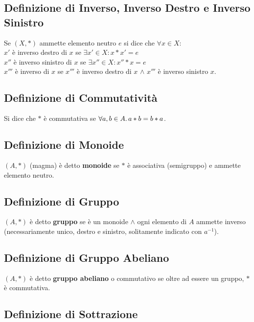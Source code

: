 \documentclass[a4paper, twoside, italian, 11pt]{book}
\begin{document}
\subsection{Definizione di Inverso, Inverso Destro e Inverso Sinistro}

Se $(X, *)$ ammette elemento neutro $e$ si dice che $\forall x \in X$: \\

$x'$ è inverso destro di $x$ se $\exists x' \in X : x * x' = e$ \\
\indent
$x''$ è inverso sinistro di $x$ se $\exists x'' \in X : x'' * x = e$ \\
\indent
$x'''$ è inverso di $x$ se $x'''$ è inverso destro di $x$ $\land$ $x'''$ è inverso sinistro $x$.


\subsection{Definizione di Commutatività}

Si dice che $*$ è commutativa se $\forall a,b \in A \ldotp a * b = b * a$.


\subsection{Definizione di Monoide}

$(A, *)$ (magma) è detto \textbf{monoide} se $*$ è associativa (semigruppo) e ammette elemento neutro.


\subsection{Definizione di Gruppo}

$(A, *)$ è detto \textbf{gruppo} se è un monoide $\land$ ogni elemento di $A$ ammette inverso (necessariamente unico, destro e sinistro, solitamente indicato con $a^{-1}$).


\subsection{Definizione di Gruppo Abeliano}

$(A, *)$ è detto \textbf{gruppo abeliano} o commutativo se oltre ad essere un gruppo, $*$ è commutativa.


\subsection{Definizione di Sottrazione}
\end{document}
